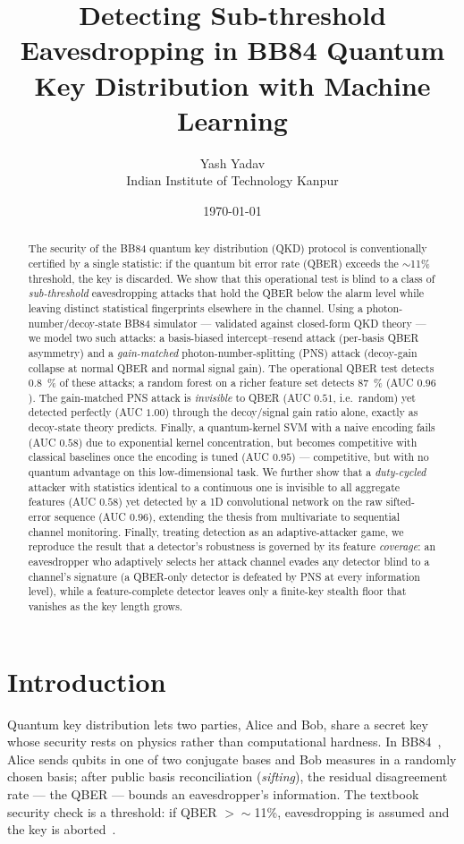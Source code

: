 \documentclass[11pt]{article}
\title{\textbf{Detecting Sub-threshold Eavesdropping in BB84 Quantum Key
Distribution with Machine Learning}}
\author{Yash Yadav \\ \small Indian Institute of Technology Kanpur}
\date{\today}
\begin{document}
\maketitle

\begin{abstract}
The security of the BB84 quantum key distribution (QKD) protocol is conventionally
certified by a single statistic: if the quantum bit error rate (QBER) exceeds the
$\sim$11\% threshold, the key is discarded. We show that this operational test is
blind to a class of \emph{sub-threshold} eavesdropping attacks that hold the QBER
below the alarm level while leaving distinct statistical fingerprints elsewhere in
the channel. Using a photon-number/decoy-state BB84 simulator --- validated against
closed-form QKD theory --- we model two such attacks: a basis-biased
intercept--resend attack (per-basis QBER asymmetry) and a \emph{gain-matched}
photon-number-splitting (PNS) attack (decoy-gain collapse at normal QBER and normal
signal gain). The operational QBER test detects \SI{0.8}{\percent} of these attacks;
a random forest on a richer feature set detects \SI{87}{\percent} (AUC $0.96$). The
gain-matched PNS attack is \emph{invisible} to QBER (AUC $0.51$, i.e.\ random) yet
detected perfectly (AUC $1.00$) through the decoy/signal gain ratio alone, exactly as
decoy-state theory predicts. Finally, a quantum-kernel SVM with a naive encoding
fails (AUC $0.58$) due to exponential kernel concentration, but becomes competitive
with classical baselines once the encoding is tuned (AUC $0.95$) --- competitive, but
with no quantum advantage on this low-dimensional task. We further show that a
\emph{duty-cycled} attacker with statistics identical to a continuous one is
invisible to all aggregate features (AUC $0.58$) yet detected by a 1D convolutional
network on the raw sifted-error sequence (AUC $0.96$), extending the thesis from
multivariate to sequential channel monitoring. Finally, treating detection as an
adaptive-attacker game, we reproduce the result that a detector's robustness is
governed by its feature \emph{coverage}: an eavesdropper who adaptively selects her
attack channel evades
any detector blind to a channel's signature (a QBER-only detector is defeated by
PNS at every information level), while a feature-complete detector leaves only a
finite-key stealth floor that vanishes as the key length grows.
\end{abstract}

\section{Introduction}
Quantum key distribution lets two parties, Alice and Bob, share a secret key whose
security rests on physics rather than computational hardness. In BB84~\cite{bb84},
Alice sends qubits in one of two conjugate bases and Bob measures in a randomly
chosen basis; after public basis reconciliation (\emph{sifting}), the residual
disagreement rate --- the QBER --- bounds an eavesdropper's information. The textbook
security check is a threshold: if QBER $>\sim$11\%, eavesdropping is assumed and the
key is aborted~\cite{shorpreskill}.
\end{document}
